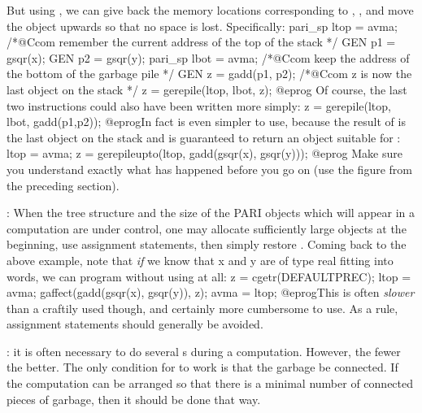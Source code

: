But using , we can give back the memory locations corresponding
to , , and move the object  upwards so that no
space is lost. Specifically:
\bprog
  pari_sp ltop = avma;  /*@Ccom remember the current address of the top of the stack */
  GEN p1 = gsqr(x);
  GEN p2 = gsqr(y);
  pari_sp lbot = avma;  /*@Ccom keep the address of the bottom of the garbage pile */
  GEN z = gadd(p1, p2); /*@Ccom z is now the last object on the stack */
  z = gerepile(ltop, lbot, z);
@eprog
\noindent Of course, the last two instructions could also have been
written more simply:
\bprog
  z = gerepile(ltop, lbot, gadd(p1,p2));
@eprog\noindent In fact  is even simpler to use, because
the result of  is the last object on the stack and 
is guaranteed to return an object suitable for :
\bprog
  ltop = avma;
  z = gerepileupto(ltop, gadd(gsqr(x), gsqr(y)));
@eprog\noindent
Make sure you understand exactly what has happened before you go on (use the
figure from the preceding section).

: When the tree structure and
the size of the PARI objects which will appear in a computation are under
control, one may allocate sufficiently large objects at the beginning,
use assignment statements, then simply restore . Coming back to the
above example, note that \emph{if} we know that x and y are of type real
fitting into  words, we can program without using
 at all:
\bprog
  z = cgetr(DEFAULTPREC); ltop = avma;
  gaffect(gadd(gsqr(x), gsqr(y)), z);
  avma = ltop;
@eprog\noindent This is often \emph{slower} than a craftily used
 though, and certainly more cumbersome to use. As a rule,
assignment statements should generally be avoided.

: it is often necessary to do several
s during a computation. However, the fewer the better. The only
condition for  to work is that the garbage be connected. If the
computation can be arranged so that there is a minimal number of connected
pieces of garbage, then it should be done that way.

